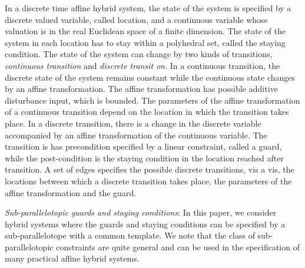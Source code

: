 In a discrete time affine hybrid system, the state of the system is
specified by a discrete valued variable, called location, and a
continuous variable whose valuation is in the real Euclidean space of
a finite dimension.  The state of the system in each location has to
stay within a polyhedral set, called the staying condition.  The state
of the system can change by two kinds of transitions, {\it continuous
  transition} and {\it discrete transit on}.  In a continuous
transition, the discrete state of the system remains constant while
the continuous state changes by an affine transformation.  The affine
transformation has possible additive disturbance input, which is
bounded.  The parameters of the affine transformation of a continuous
transition depend on the location in which the transition takes place.
In a discrete transition, there is a change in the discrete variable
accompanied by an affine transformation of the continuous variable.
The transition is has precondition specified by a linear constraint,
called a guard, while the post-condition is the staying condition in
the location reached after transition.  A set of edges specifies
the possible discrete transitions, vis a vis, the locations between
which a discrete transition takes place, the parameters of the affine
transformation and the guard.   

{\it Sub-parallelotopic guards and staying conditions}: In this paper,
we consider hybrid systems where the guards and staying conditions can
be specified by a sub-parallelotope with a common template.  We note
that the class of sub-parallelotopic constraints are quite general and
can be used in the specification of many practical affine hybrid
systems.  

